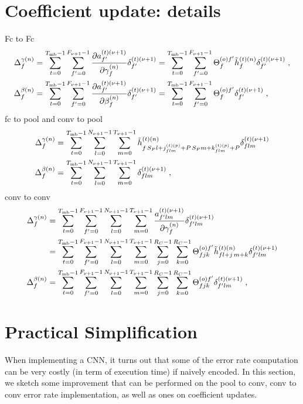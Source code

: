 \begin{subappendices}
\section{Coefficient update: details}
Fc to Fc
\begin{align}
\Delta_f^{\gamma(n)}&=\sum_{t=0}^{T_{{\rm mb}}-1}\sum_{f'=0}^{F_{\nu+1}-1}
%
\frac{\partial a^{(t)(\nu+1)}_{f'}}{\partial\gamma_f^{(n)}}\delta^{(t)(\nu+1)}_{f'}
%
=\sum_{t=0}^{T_{{\rm mb}}-1}\sum_{f'=0}^{F_{\nu+1}-1}
%
\Theta^{(o)f'}_{f}\tilde{h}^{(t)(n)}_{f}\delta^{(t)({\nu+1})}_{f'}\;,\\
%
\Delta_f^{\beta(n)}&=\sum_{t=0}^{T_{{\rm mb}}-1}\sum_{f'=0}^{F_{\nu+1}-1}
%
\frac{\partial a^{(t)(\nu+1)}_{f'}}{\partial\beta_f^{(n)}}\delta^{(t)(\nu+1)}_{f'}
%
=\sum_{t=0}^{T_{{\rm mb}}-1}\sum_{f'=0}^{F_{\nu+1}-1}\Theta^{(o)f'}_{f}\delta^{(t)(\nu+1)}_{f'}\;,
\end{align}
fc to pool and conv to pool
\begin{align}
\Delta_f^{\gamma(n)}&=
%
\sum_{t=0}^{T_{{\rm mb}}-1}\sum_{l=0}^{N_{\nu+1}-1}\sum_{m=0}^{T_{\nu+1}-1}
%
\tilde{h}_{f\,S_P l+j_{flm}^{(t)(p)}+P\,S_Pm+k_{flm}^{(t)(p)}+P}^{(t)(n)}\delta^{(t)(\nu+1)}_{flm}\\
%
\Delta_f^{\beta(n)}&=
%
\sum_{t=0}^{T_{{\rm mb}}-1}\sum_{l=0}^{N_{\nu+1}-1}\sum_{m=0}^{T_{\nu+1}-1}\delta^{(t)(\nu+1)}_{flm}\;,
\end{align}
conv to conv
\begin{align}
\Delta_f^{\gamma(n)}&=
%
\sum_{t=0}^{T_{{\rm mb}}-1}\sum_{f'=0}^{F_{\nu+1}-1}\sum_{l=0}^{N_{\nu+1}-1}\sum_{m=0}^{T_{\nu+1}-1}
%
\frac{a^{(t)(\nu+1)}_{f'lm}}{\partial \gamma_f^{(n)}}\delta^{(t)(\nu+1)}_{f'lm}\\
%
&=\sum_{t=0}^{T_{{\rm mb}}-1}\sum_{f'=0}^{F_{\nu+1}-1}\sum_{l=0}^{N_{\nu+1}-1}\sum_{m=0}^{T_{\nu+1}-1}
%
\sum_{j=0}^{R_C-1}\sum_{k=0}^{R_C-1}\Theta^{(o)f'}_{fjk}
%
\tilde{h}^{(t)(n)}_{fl+j\,m+k}\delta^{(t)(\nu+1)}_{f'lm}\\
%
\Delta_f^{\beta(n)}&=
%
\sum_{t=0}^{T_{{\rm mb}}-1}\sum_{f'=0}^{F_{\nu+1}-1}\sum_{l=0}^{N_{\nu+1}-1}\sum_{m=0}^{T_{\nu+1}-1}
%
\sum_{j=0}^{R_C-1}\sum_{k=0}^{R_C-1}\Theta^{(o)f'}_{fjk}\delta^{(t)(\nu+1)}_{f'lm}\;,
\end{align}

\section{Practical Simplification} \label{sec:pracsimpl}

When implementing a CNN, it turns out that some of the error rate computation can be very costly (in term of execution time) if naively encoded. In this section, we sketch some improvement that can be performed on the pool to conv, conv to conv error rate implementation, as well as ones on coefficient updates.


\end{subappendices}
